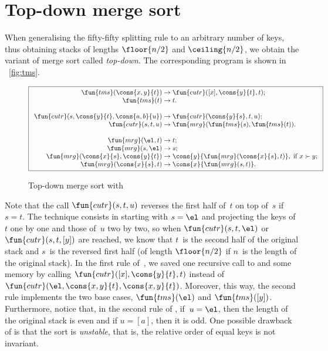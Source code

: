 \section{Top-down merge sort}

When generalising the fifty\hyp{}fifty splitting rule to an arbitrary
number of keys, thus obtaining stacks of lengths \(\floor{n/2}\) and
\(\ceiling{n/2}\), we obtain the variant of merge sort called
\emph{top\hyp{}down}. The corresponding program is shown in
\fig~\vref{fig:tms}.
\begin{figure}[!b]
\begin{equation*}
\boxed{%
\begin{array}{r@{\;}l@{\;}l}
\fun{tms}(\cons{x,y}{t}) & \rightarrow
                         & \fun{cutr}([x],\cons{y}{t},t);\\
\fun{tms}(t)             & \rightarrow & t.\\
\\
\fun{cutr}(s,\cons{y}{t},\cons{a,b}{u})
                       & \rightarrow & \fun{cutr}(\cons{y}{s},t,u);\\
\fun{cutr}(s,t,u)        & \rightarrow
                         & \fun{mrg}(\fun{tms}(s),\fun{tms}(t)).\\
\\
\fun{mrg}(\el,t)         & \rightarrow & t;\\
\fun{mrg}(s,\el)         & \rightarrow & s;\\
\fun{mrg}(\cons{x}{s},\cons{y}{t}) & \rightarrow
                         & \cons{y}{\fun{mrg}(\cons{x}{s},t)},\;
                           \text{if \(x \succ y\)};\\
\fun{mrg}(\cons{x}{s},t) & \rightarrow & \cons{x}{\fun{mrg}(s,t)}.
\end{array}}
\end{equation*}
\caption{Top-down merge sort with }
\label{fig:tms}
\end{figure}
Note that the call \(\fun{cutr}(s,t,u)\)
reverses the first half of~\(t\) on top of~\(s\) if~\(s=t\). The
technique consists in starting with \(s=\el\) and projecting the keys
of~\(t\) one by one and those of~\(u\) two by two, so when
\(\fun{cutr}(s,t,\el)\) or \(\fun{cutr}(s,t,[y])\) are reached, we
know that \(t\)~is the second half of the original stack and \(s\)~is
the reversed first half (of length \(\floor{n/2}\) if \(n\)~is the
length of the original stack). In the first rule of~, we
saved one recursive call to  and some memory by calling
\(\fun{cutr}([x],\cons{y}{t}, t)\) instead of
\(\fun{cutr}(\el,\cons{x,y}{t},\cons{x,y}{t})\). Moreover, this way,
the second rule implements the two base cases, \(\fun{tms}(\el)\) and
\(\fun{tms}([y])\). Furthermore, notice that, in the second rule of
, if~\(u = \el\), then the length of the original stack is
even and if \(u = [a]\), then it is odd. One possible drawback of
 is that the sort is
\emph{unstable}, that is, the relative order of equal keys is not
invariant.

